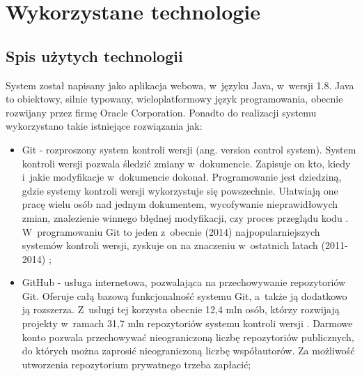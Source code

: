 \chapter{Wykorzystane technologie}

\section{Spis użytych technologii}
System został napisany jako aplikacja webowa, w~języku Java, w~wersji 1.8. Java to obiektowy, silnie typowany, wieloplatformowy język programowania, obecnie rozwijany przez firmę Oracle Corporation. Ponadto do realizacji systemu wykorzystano takie istniejące rozwiązania jak:

\begin{itemize}

\item Git - rozproszony system kontroli wersji (ang. version control system). System kontroli wersji pozwala śledzić zmiany w~dokumencie. Zapisuje on kto, kiedy i~jakie modyfikacje w~dokumencie dokonał. Programowanie jest dziedziną, gdzie systemy kontroli wersji wykorzystuje się powszechnie. Ułatwiają one pracę wielu osób nad jednym dokumentem, wycofywanie nieprawidłowych zmian, znalezienie winnego błędnej modyfikacji, czy proces przeglądu kodu \cite{PoCoKontrola}. W~programowaniu Git to jeden z~obecnie (2014) najpopularniejszych systemów kontroli wersji, zyskuje on na znaczeniu w~ostatnich latach (2011-2014) \cite{EclipseSurvey};

\medskip
\item GitHub - usługa internetowa, pozwalająca na przechowywanie repozytoriów Git. Oferuje całą bazową funkcjonalność systemu Git, a~także ją dodatkowo ją rozszerza. Z~usługi tej korzysta obecnie 12,4 mln osób, którzy rozwijają projekty w~ramach 31,7 mln repozytoriów systemu kontroli wersji \cite{GitHubPress}. Darmowe konto pozwala przechowywać nieograniczoną liczbę repozytoriów publicznych, do których można zaprosić nieograniczoną liczbę współautorów. Za możliwość utworzenia repozytorium prywatnego trzeba zapłacić;


\end{itemize}
